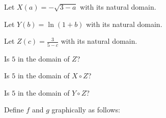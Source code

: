 \documentclass{ximera}
\begin{document}
\begin{example}


Let $X(a) = -\sqrt{3 - a}$ with its natural domain.


Let $Y(b) = \ln(1 + b)$ with its natural domain.


Let $Z(c) = \frac{3}{5 - c}$ with its natural domain.



\begin{question}

Is $5$ in the domain of $Z$?

\begin{multipleChoice}
\end{multipleChoice}

\end{question}





\begin{question}

Is $5$ in the domain of $X \circ Z$?

\begin{multipleChoice}
\end{multipleChoice}

\end{question}



\begin{question}

Is $5$ in the domain of $Y \circ Z$?

\begin{multipleChoice}
\end{multipleChoice}

\end{question}




\end{example}








Define $f$ and $g$ graphically as follows:
\end{document}
